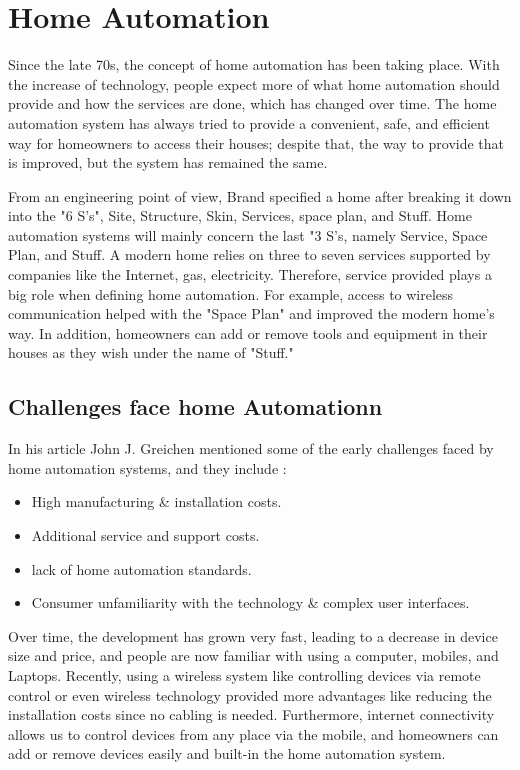 \documentclass[conference]{IEEEtran}
\begin{document}
\section{Home Automation}

Since the late 70s, the concept of home automation has been taking place. With the increase of technology, people expect more of what home automation should provide and how the services are done, which has changed over time. The home automation system has always tried to provide a convenient, safe, and efficient way for homeowners to access their houses; despite that, the way to provide that is improved, but the system has remained the same.  


From an engineering point of view, Brand\cite{brand} specified a home after breaking it down into the "6 S's", Site, Structure, Skin, Services, space plan, and Stuff. Home automation systems will mainly concern the last "3 S's, namely Service, Space Plan, and Stuff. A  modern home relies on three to seven services supported by companies like the Internet, gas, electricity. Therefore, service provided plays a big role when defining home automation. For example, access to wireless communication helped with the "Space Plan" and improved the modern home's way. In addition, homeowners can add or remove tools and equipment in their houses as they wish under the name of "Stuff."

\subsection{Challenges face home Automationn }

 In his article John J. Greichen  \cite{Greichen } mentioned some of the early challenges faced by home automation systems, and they include : 
 
 
 \begin{itemize}
 	\item High manufacturing \& installation costs.
 \item Additional service and support costs.
 \item lack of home automation standards.
 \item Consumer unfamiliarity with the technology \& complex user interfaces. 
 	
 \end{itemize}

Over time, the development has grown very fast, leading to a decrease in device size and price, and people are now familiar with using a computer, mobiles, and Laptops. Recently, using a wireless system like controlling devices via remote control or even wireless technology provided more advantages like reducing the installation costs since no cabling is needed. Furthermore, internet connectivity allows us to control devices from any place via the mobile, and homeowners can add or remove devices easily and built-in the home automation system. 
\end{document}
